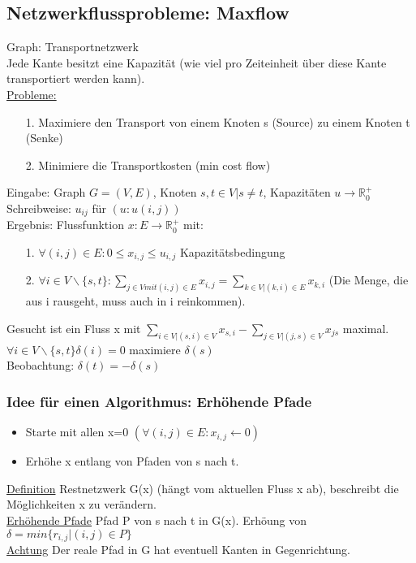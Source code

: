 \documentclass[a4paper]{article}
\begin{document}
\subsection*{Netzwerkflussprobleme: Maxflow }
Graph: Transportnetzwerk \\
Jede Kante besitzt eine Kapazität (wie viel pro Zeiteinheit über diese Kante transportiert werden kann).\\
\underline{Probleme:}
\begin{itemize}
\item[1. ]Maximiere den Transport von einem Knoten s (Source) zu einem Knoten t (Senke)
\item[2. ]Minimiere die Transportkosten (min cost flow)
\end{itemize} 
Eingabe: Graph $G=(V,E)$, Knoten $s, t \in V | s\neq t$, Kapazitäten $u\rightarrow \mathbb{R}^+_0$\\
Schreibweise: $u_{ij}$ für $(u: u(i,j))$\\
Ergebnis: Flussfunktion $x: E \rightarrow \mathbb{R}^+_0$ mit:
\begin{itemize}
\item[1. ]$\forall (i,j) \in E: 0\leq x_{i,j} \leq u_{i,j}$ Kapazitätsbedingung
\item[2. ]$\forall i\in V \backslash \{s,t\}: \sum_{j\in V mit (i,j)\in E} x_{i,j} = \sum_{k\in V | (k,i)\in E} x_{k,i}$ (Die Menge, die aus i rausgeht, muss auch in i reinkommen).
\end{itemize}
Gesucht ist ein Fluss x mit $\sum_{i\in V | (s,i)\in V} x_{s,i} - \sum_{j\in V | (j,s)\in V} x_{js}$ maximal.\\
$\forall i\in V \backslash \{s,t\}  \delta (i)=0$ maximiere $\delta (s)$\\
Beobachtung: $\delta (t) =-\delta (s)$\\
\subsubsection*{Idee für einen Algorithmus: Erhöhende Pfade}
\begin{itemize}
\item Starte mit allen x=0 $(\forall (i,j) \in E: x_{i,j} \leftarrow 0)$
\item Erhöhe x entlang von Pfaden von s nach t.
\end{itemize}
\underline{Definition} Restnetzwerk G(x) (hängt vom aktuellen Fluss x ab), beschreibt die Möglichkeiten x zu verändern.\\
\underline{Erhöhende Pfade} Pfad P von s nach t in G(x). Erhöung von $\delta = min \{ r_{i,j} | (i,j)\in P\}$\\
\underline{Achtung} Der reale Pfad in G hat eventuell Kanten in Gegenrichtung.
\end{document}
